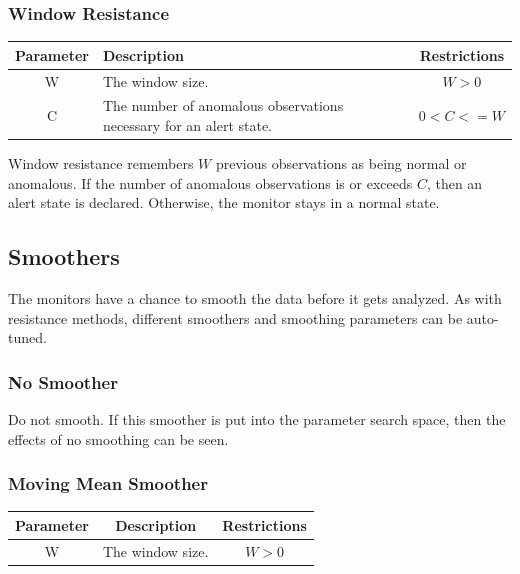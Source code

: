 \documentclass[12pt]{ucthesis}
\begin{document}
\subsubsection{Window Resistance}
\begin{table}[H]
   \begin{center}
      \begin{tabular}{|c|p{9cm}|c|}
         \hline
            Parameter & Description & Restrictions \\
         \hline
            W & The window size. & $ W > 0 $ \\
         \hline
            C & The number of anomalous observations necessary for an alert state. & $ 0 < C <= W $ \\
         \hline
      \end{tabular}
   \end{center}
\end{table}

Window resistance remembers $W$  previous observations as being normal or anomalous. If the number of anomalous
observations is or exceeds $C$, then an alert state is declared. Otherwise, the monitor stays in a normal state.

\subsection{Smoothers}
\label{arch-smoothers}
The monitors have a chance to smooth the data before it gets analyzed.
As with resistance methods, different smoothers and smoothing parameters can be auto-tuned.

\subsubsection{No Smoother}
Do not smooth. If this smoother is put into the parameter search space, then the effects of no smoothing can be seen.

\subsubsection{Moving Mean Smoother}
\begin{table}[H]
   \begin{center}
      \begin{tabular}{|c|c|c|}
         \hline
            Parameter & Description & Restrictions \\
         \hline
            W & The window size. & $ W > 0 $ \\
         \hline
      \end{tabular}
   \end{center}
\end{table}
\end{document}
